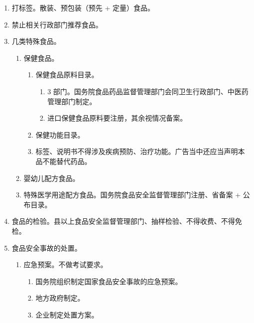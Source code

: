 \begin{enumerate}
        \begin{enumerate}
          \item 生产者召回是原则，经营者召回是例外（经营者原因导致）。该召回但没有召回的 \yjt 强制召回。
          \item 无害化处理 \hz 销毁。
          \item 标签、标志、说明书不符合安全标准而被召回是可以继续销售（产品本身没问题）。
        \end{enumerate}
  \item 打标签。散装、预包装（预先 + 定量）食品。
  \item 禁止相关行政部门推荐食品。
  \item 几类特殊食品。
        \begin{enumerate}
          \item 保健食品。
                \begin{enumerate}
                  \item 保健食品原料目录。
                        \begin{enumerate}
                          \item 3 部门。国务院食品药品监督管理部门会同卫生行政部门、中医药管理部门制定。
                          \item 进口保健食品原料要注册，其余视情况备案。
                        \end{enumerate}
                  \item 保健功能目录。
                  \item 标签、说明书不得涉及疾病预防、治疗功能。广告当中还应当声明本品不能替代药品。
                \end{enumerate}
          \item 婴幼儿配方食品。
          \item 特殊医学用途配方食品。国务院食品安全监督管理部门注册、省备案 + 公布目录。
        \end{enumerate}
  \item 食品的检验。县以上食品安全监督管理部门、抽样检验、不得收费、不得免检。
  \item 食品安全事故的处置。
        \begin{enumerate}
          \item 应急预案。不做考试要求。
                \begin{enumerate}
                  \item 国务院组织制定国家食品安全事故的应急预案。
                  \item 地方政府制定。
                  \item 企业制定处置方案。

\end{enumerate}
\end{enumerate}
\end{enumerate}
